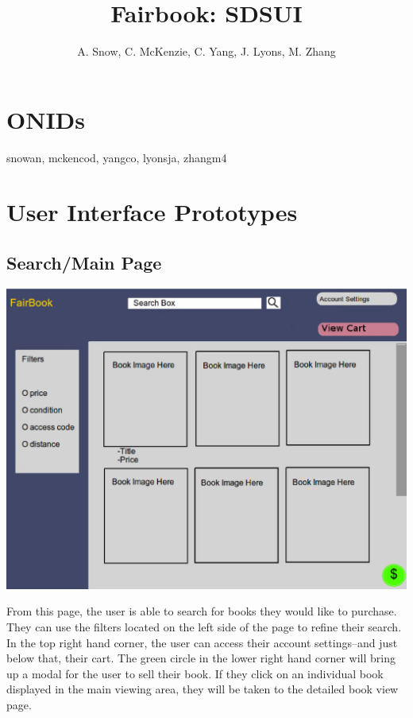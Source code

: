 \documentclass[12pt]{article}
\title{Fairbook: SDSUI}
\author{A. Snow, C. McKenzie, C. Yang, J. Lyons, M. Zhang}
\begin{document}
	\maketitle
	
	\tableofcontents
		\section{ONIDs}
		snowan, mckencod, yangco, lyonsja, zhangm4

	\section{User Interface Prototypes}

		\subsection{Search/Main Page}
		\includegraphics[width=14cm]{main_page.eps}
			\par
			From this page, the user is able to search for books they would like to purchase. 
			They can use the filters located on the left side of the page to refine their search. 
			In the top right hand corner, the user can access their account settings--and just below that, their cart. 
			The green circle in the lower right hand corner will bring up a modal for the user to sell their book. 
			If they click on an individual book displayed in the main viewing area, they will be taken to the detailed book view page.
\end{document}
